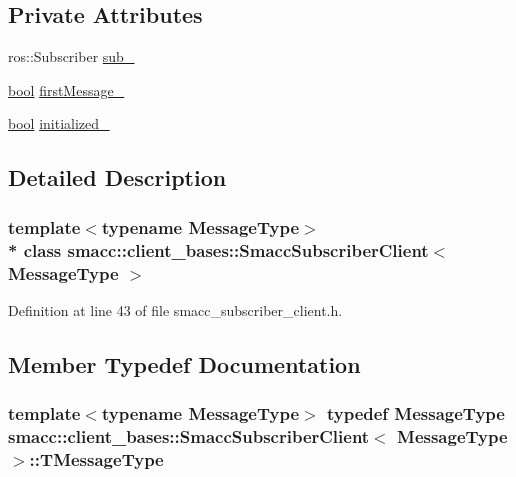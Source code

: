 \subsection*{Private Attributes}
\begin{DoxyCompactItemize}
\item 
ros\+::\+Subscriber \hyperlink{classsmacc_1_1client__bases_1_1SmaccSubscriberClient_a0f69a1b0a284ae47f5d717c6ab95f089}{sub\+\_\+}
\item 
\hyperlink{classbool}{bool} \hyperlink{classsmacc_1_1client__bases_1_1SmaccSubscriberClient_a1283e89a0d33a9028a5042519c6869a6}{first\+Message\+\_\+}
\item 
\hyperlink{classbool}{bool} \hyperlink{classsmacc_1_1client__bases_1_1SmaccSubscriberClient_a2096c76f6464d0a513625cc53dba51ed}{initialized\+\_\+}
\end{DoxyCompactItemize}


\subsection{Detailed Description}
\subsubsection*{template$<$typename Message\+Type$>$\\*
class smacc\+::client\+\_\+bases\+::\+Smacc\+Subscriber\+Client$<$ Message\+Type $>$}



Definition at line 43 of file smacc\+\_\+subscriber\+\_\+client.\+h.



\subsection{Member Typedef Documentation}
\subsubsection[{\texorpdfstring{T\+Message\+Type}{TMessageType}}]{\setlength{\rightskip}{0pt plus 5cm}template$<$typename Message\+Type$>$ typedef Message\+Type {\bf smacc\+::client\+\_\+bases\+::\+Smacc\+Subscriber\+Client}$<$ Message\+Type $>$\+::{\bf T\+Message\+Type}}\hypertarget{classsmacc_1_1client__bases_1_1SmaccSubscriberClient_a61d798bda71bf335d72e61928ca561b0}{}\label{classsmacc_1_1client__bases_1_1SmaccSubscriberClient_a61d798bda71bf335d72e61928ca561b0}


